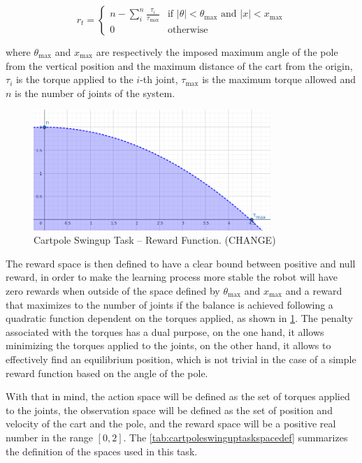 \begin{equation}
    r _t = \begin{cases}
        n - \sum _i ^n \frac{\tau _i}{\tau _{\text{max}}} & \text{if } \left| \theta \right| < \theta_{\text{max}} \text{ and } \left| x \right| < x_{\text{max}} \\
        0                                                 & \text{otherwise}
    \end{cases}
\end{equation}

where $\theta_{\text{max}}$ and $x _{\text{max}}$ are respectively the imposed maximum angle of the pole from the vertical position and the maximum distance of the cart from the origin, $\tau _i$ is the torque applied to the $i$-th joint, $\tau _{\text{max}}$ is the maximum torque allowed and $n$ is the number of joints of the system.

\begin{figure}
    \centering
    \includegraphics[width=0.8\textwidth]{Images/cartpole_reward.png}
    \caption{Cartpole Swingup Task -- Reward Function. (CHANGE)}
    \label{fig:cartpolereward}
\end{figure}

The reward space is then defined to have a clear bound between positive and null reward, in order to make the learning process more stable the robot will have zero rewards when outside of the space defined by $\theta_{\text{max}}$ and $x _{\text{max}}$ and a reward that maximizes to the number of joints if the balance is achieved following a quadratic function dependent on the torques applied, as shown in \cref{fig:cartpolereward}. The penalty associated with the torques has a dual purpose, on the one hand, it allows minimizing the torques applied to the joints, on the other hand, it allows to effectively find an equilibrium position, which is not trivial in the case of a simple reward function based on the angle of the pole.

With that in mind, the action space will be defined as the set of torques applied to the joints, the observation space will be defined as the set of position and velocity of the cart and the pole, and the reward space will be a positive real number in the range $[0,2]$. The \cref{tab:cartpoleswinguptaskspacedef} summarizes the definition of the spaces used in this task.

